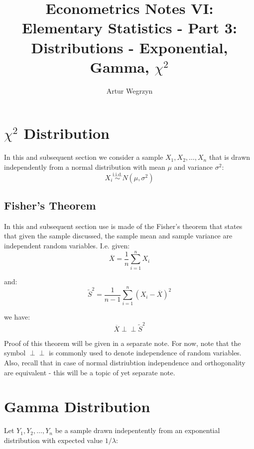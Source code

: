 \documentclass[12pt]{article}
\begin{document}
\title{Econometrics Notes VI: Elementary Statistics - Part 3: Distributions - Exponential, Gamma, $\chi^2$}
\author{Artur Wegrzyn}
\maketitle


\tableofcontents


\section{$\chi^2$ Distribution}
In this and subsequent section we consider a sample $X_1, X_2, \dots, X_n$ 
that is drawn independently from a normal 
distribution with mean $\mu$ and variance $\sigma^2$:
\begin{equation*}
X_i \overset{\text{i.i.d.}}{\sim} N(\mu, \sigma^2)
\end{equation*}


\subsection{Fisher's Theorem}
In this and subsequent section use is made of the Fisher's theorem that states 
that given the sample discussed, the sample mean and sample variance are independent 
random variables. I.e. given:
\begin{equation*}
\overline{X} = \frac{1}{n} \sum_{i=1}^{n} X_i
\end{equation*}

and:
\begin{equation*}
\tilde{S}^2 = \frac{1}{n-1} \sum_{i=1}^{n} (X_i - \overline{X})^2
\end{equation*}

we have:
\begin{equation*}
\overline{X} \perp\!\!\!\perp \tilde{S}^2
\end{equation*}

Proof of this theorem will be given in a separate note. For now, note that the symbol 
$\perp\!\!\!\perp$ is commonly used to denote independence of random variables. Also, 
recall that in case of normal distriubtion independence and orthogonality 
are equivalent - this will be a topic of yet separate note.


\section{Gamma Distribution}
Let $Y_1, Y_2, \dots, Y_n$ be a sample drawn indepentently from an exponential 
distribution with expected value $1 / \lambda$:
\end{document}
